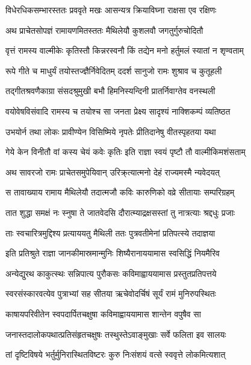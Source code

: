 \twolineshloka
{विधेरधिकसम्भारस्ततः प्रववृते मखः}
{आसन्यत्र क्रियाविघ्ना राक्षसा एव रक्षिणः} %

\twolineshloka
{अथ प्राचेतसोपज्ञं रामायणमितस्ततः}
{मैथिलेयौ कुशलवौ जगतुर्गुरुचोदितौ} %

\twolineshloka
{वृत्तं रामस्य वाल्मीकेः कृतिस्तौ किन्नरस्वनौ}
{किं तद्येन मनो हर्तुमलं स्यातां न शृण्वताम्} %

\twolineshloka
{रूपे गीते च माधुर्यं तयोस्तज्ज्ञैर्निवेदितम्}
{ददर्श सानुजो रामः शुश्राव च कुतूहली} %

\twolineshloka
{तद्गीतश्रवणैकाग्रा संसदश्रुमुखी बभौ}
{हिमनिस्यन्दिनी प्रातर्निवाग्तेव वनस्थली} %

\twolineshloka
{वयोवेषविसंवादि रामस्य च तयोश्च सा}
{जनता प्रेक्ष्य सादृश्यं नाक्शिकम्पं व्यतिष्ठत} %

\twolineshloka
{उभयोर्न तथा लोकः प्रावीण्येन विसिष्मिये}
{नृपतेः प्रीतिदानेषु वीतस्पृहतया यथा} %

\twolineshloka
{गेये केन विनीतौ वां कस्य चेयं कवेः कृतिः}
{इति राज्ञा स्वयं पृष्टौ तौ वाल्मीकिमशंसताम्} %

\twolineshloka
{अथ सावरजो रामः प्राचेतसमुपेयिवान्}
{उरिक्र्त्यात्मनो देहं राज्यमस्मै न्यवेदयत्} %

\twolineshloka
{स तावाख्याय रामाय मैथिलेयौ तदात्मजौ}
{कविः कारुणिको वव्रे सीतायाः सम्परिग्रहम्} %

\twolineshloka
{तात शुद्धा समक्षं नः स्नुषा ते जातवेदसि}
{दौरात्म्याद्रक्षसस्तां तु नात्रत्याः श्रद्दधुः प्रजाः} %

\twolineshloka
{ताः स्वचारित्रमुद्दिश्य प्रत्याययतु मैथिली}
{ततः पुत्रवतीमेनां प्रतिपत्स्ये तदाज्ञया} %

\twolineshloka
{इति प्रतिश्रुते राज्ञा जानकीमास्रमान्मुनिः}
{शिष्यैरानाययामास स्वसिद्धिं नियमैरिव} %

\twolineshloka
{अन्येद्युरथ काकुत्स्थः सन्निपात्य पुरौकसः}
{कविमाह्वाययामास प्रस्तुतप्रतिपत्तये} %

\twolineshloka
{स्वरसंस्कारवत्येव पुत्राभ्यां सह सीतया}
{ऋचेवोदर्चिषं सूर्यं रामं मुनिरुपस्थितः} %

\twolineshloka
{काषायपरिवीतेन स्वपदार्पितचक्षुषा}
{कविमाह्वाययामास शान्तेन वपुषैव सा} %

\twolineshloka
{जनास्तदालोकपथात्प्रतिसंहृतचक्षुषः}
{तस्थुस्तेऽवाङ्मुखाः सर्वे फलिता इव सालयः} %

\twolineshloka
{तां दृष्टिविषये भर्तुर्मुनिरास्थितविष्टरः}
{कुरु निःसंशयं वत्से स्ववृत्ते लोकमित्यशात्} %

